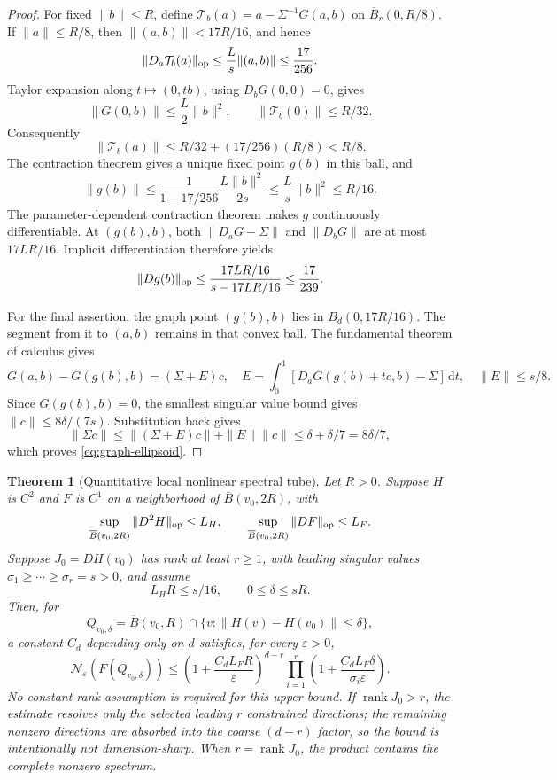 \documentclass[11pt]{article}
\newtheorem{theorem}{Theorem}[section]
\theoremstyle{definition}
\newcommand{\cN}{\mathcal N}
\newcommand{\rank}{\operatorname{rank}}
\newcommand{\dd}{\,\mathrm d}
\begin{document}
\begin{proof}
For fixed $\|b\|\le R$, define
$\mathcal T_b(a)=a-\Sigma^{-1}G(a,b)$ on
$\overline B_r(0,R/8)$.  If $\|a\|\le R/8$, then
$\|(a,b)\|<17R/16$, and hence
\[
 \|D_a\mathcal T_b(a)\|_{\rm op}
 \le \frac{L}{s}\|(a,b)\|\le\frac{17}{256}.
\]
Taylor expansion along $t\mapsto(0,tb)$, using $D_bG(0,0)=0$, gives
\[
 \|G(0,b)\|\le\frac L2\|b\|^2,
 \qquad \|\mathcal T_b(0)\|\le R/32.
\]
Consequently
\[
 \|\mathcal T_b(a)\|
 \le R/32+(17/256)(R/8)<R/8.
\]
The contraction theorem gives a unique fixed point $g(b)$ in this ball, and
\[
 \|g(b)\|
 \le\frac{1}{1-17/256}\frac{L\|b\|^2}{2s}
 \le\frac{L}{s}\|b\|^2\le R/16.
\]
The parameter-dependent contraction theorem makes $g$ continuously
differentiable.  At $(g(b),b)$, both
$\|D_aG-\Sigma\|$ and $\|D_bG\|$ are at most $17LR/16$.  Implicit
differentiation therefore yields
\[
 \|Dg(b)\|_{\rm op}
 \le\frac{17LR/16}{s-17LR/16}\le\frac{17}{239}.
\]

For the final assertion, the graph point $(g(b),b)$ lies in
$B_d(0,17R/16)$.  The segment from it to $(a,b)$ remains in that convex ball.
The fundamental theorem of calculus gives
\[
 G(a,b)-G(g(b),b)=(\Sigma+E)c,
 \quad
 E=\int_0^1[D_aG(g(b)+tc,b)-\Sigma]\dd t,
 \quad \|E\|\le s/8.
\]
Since $G(g(b),b)=0$, the smallest singular value bound gives
$\|c\|\le8\delta/(7s)$.  Substitution back gives
\[
 \|\Sigma c\|
 \le\|(\Sigma+E)c\|+\|E\|\|c\|
 \le\delta+\delta/7=8\delta/7,
\]
which proves \eqref{eq:graph-ellipsoid}.
\end{proof}

\begin{theorem}[Quantitative local nonlinear spectral tube]
\label{thm:nonlinear-tube}
Let $R>0$.  Suppose $H$ is $C^2$ and $F$ is $C^1$ on a neighborhood of
$\overline B(v_0,2R)$, with
\[
 \sup_{\overline B(v_0,2R)}\|D^2H\|_{\rm op}\le L_H,
 \qquad
 \sup_{\overline B(v_0,2R)}\|DF\|_{\rm op}\le L_F.
\]
Suppose $J_0=DH(v_0)$ has rank at least $r\ge1$, with leading singular
values $\sigma_1\ge\cdots\ge\sigma_r=s>0$, and assume
\[
 L_HR\le s/16,
 \qquad 0\le\delta\le sR.
\]
Then, for
\[
 Q_{v_0,\delta}=\overline B(v_0,R)\cap
 \{v:\|H(v)-H(v_0)\|\le\delta\},
\]
a constant $C_d$ depending only on $d$ satisfies, for every $\varepsilon>0$,
\begin{equation}\label{eq:nonlinear-cover}
 \cN_\varepsilon(F(Q_{v_0,\delta}))
 \le \left(1+\frac{C_dL_FR}{\varepsilon}\right)^{d-r}
 \prod_{i=1}^r\left(1+\frac{C_dL_F\delta}
 {\sigma_i\varepsilon}\right).
\end{equation}
No constant-rank assumption is required for this upper bound.  If
$\rank J_0>r$, the estimate resolves only the selected leading $r$ constrained
directions; the remaining nonzero directions are absorbed into the coarse
$(d-r)$ factor, so the bound is intentionally not dimension-sharp.  When
$r=\rank J_0$, the product contains the complete nonzero spectrum.
\end{theorem}
\end{document}
